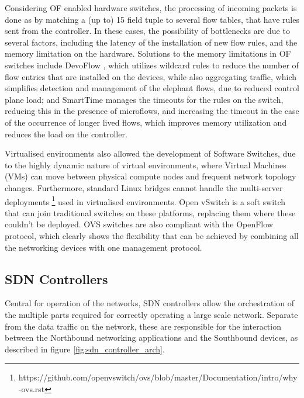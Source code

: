 \begin {enumerate}
\begin {enumerate}
\par Considering OF enabled hardware switches, the processing of incoming packets is done as by matching a (up to) 15 field tuple \cite {CITE - flow_table_management_sdn_switches} to several flow tables, 
that have rules sent from the controller. In these cases, the possibility of bottlenecks are due to several factors, including the latency of the installation of new flow rules, and the memory limitation on the hardware. Solutions 
to the memory limitations in OF switches include DevoFlow \cite {CITE - https://hal.inria.fr/hal-00825087/document}, which utilizes wildcard rules to reduce the number of flow entries that are installed on the devices, while also
aggregating traffic, which simplifies detection and management of the elephant flows, due to reduced control plane load; and SmartTime \cite {CITE - http://rishabhpoddar.com/publications/SmartTime.pdf} manages the timeouts
for the rules on the switch, reducing this in the presence of microflows, and increasing the timeout in the case of the occurrence of longer lived flows, which improves memory utilization and reduces the load on the controller.

\par Virtualised environments also allowed the development of Software Switches, due to the highly dynamic nature of virtual environments, where Virtual Machines (VMs) can move between physical compute nodes and frequent
network topology changes. Furthermore, standard Linux bridges cannot handle the multi-server deployments \footnote {https://github.com/openvswitch/ovs/blob/master/Documentation/intro/why-ovs.rst} used in virtualised environments. 
Open vSwitch is a soft switch that can join traditional switches on these platforms, replacing them where these couldn't be deployed. OVS switches are also compliant with the OpenFlow protocol, which clearly shows the flexibility
that can be achieved by combining all the networking devices with one management protocol. 

\subsection {SDN Controllers}

Central for operation of the networks, SDN controllers allow the orchestration of the multiple parts required for correctly operating a large scale network. Separate from the data traffic on the network, these are responsible for the interaction
between the Northbound networking applications and the Southbound devices, as described in figure \ref{fig:sdn_controller_arch}. 


\end{enumerate}
\end{enumerate}
